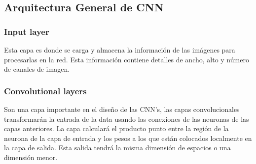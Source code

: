 \subsection{Arquitectura General de CNN}

\subsubsection{Input layer}
Esta capa es donde se carga y almacena la información de las imágenes para procesarlas en la red. Esta información contiene detalles de ancho, alto y número de canales de imagen.

\subsubsection{Convolutional layers}
Son una capa importante en el diseño de las CNN's, las capas convolucionales transformarán la entrada de la data usando las conexiones de las neuronas de las capas anteriores. La capa calculará el producto punto entre la región de la neurona de la capa de entrada y los pesos a los que están colocados localmente en la capa de salida. Esta salida tendrá la misma dimensión de espacios o una dimensión menor.

